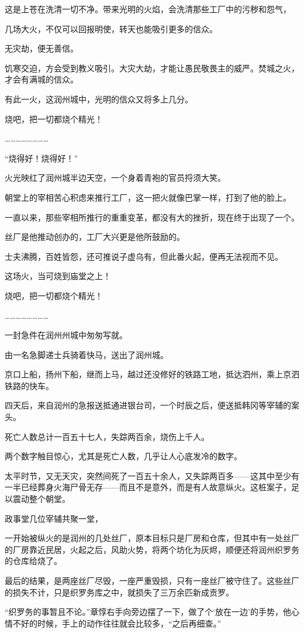 这是上苍在洗清一切不净。带来光明的火焰，会洗清那些工厂中的污秽和怨气，

几场大火，不仅可以回报明使，转天也能吸引更多的信众。

无灾劫，便无善信。

饥寒交迫，方会受到教义吸引。大灾大劫，才能让愚民敬畏主的威严。焚城之火，才会有满城的信众。

有此一火，这润州城中，光明的信众又将多上几分。

烧吧，把一切都烧个精光！

……………………

“烧得好！烧得好！”

火光映红了润州城半边天空，一个身着青袍的官员捋须大笑。

朝堂上的宰相苦心积虑来推行工厂，这一把火就像巴掌一样，打到了他的脸上。

一直以来，那些宰相所推行的重重变革，都没有大的挫折，现在终于出现了一个。

丝厂是他推动创办的，工厂大兴更是他所鼓励的。

士夫沸腾，百姓皆怨，还可推说子虚乌有，但此番火起，便再无法视而不见。

这场火，当可烧到庙堂之上！

烧吧，把一切都烧个精光！

……………………

一封急件在润州州城中匆匆写就。

由一名急脚递士兵骑着快马，送出了润州城。

京口上船，扬州下船，继而上马，越过还没修好的铁路工地，抵达泗州，乘上京泗铁路的快车。

四天后，来自润州的急报送抵通进银台司，一个时辰之后，便送抵韩冈等宰辅的案头。

死亡人数总计一百五十七人，失踪两百余，烧伤上千人。

两个数字触目惊心，尤其是死亡人数，几乎让人心底发冷的数字。

太平时节，又无天灾，突然间死了一百五十余人，又失踪两百多——这其中至少有一半已经葬身火海尸骨无存——而且不是意外，而是有人故意纵火。这桩案子，足以震动整个朝堂。

政事堂几位宰辅共聚一堂，

一开始被纵火的是润州的几处丝厂，原本目标只是厂房和仓库，但其中有一处丝厂的厂房靠近民居，火起之后，风助火势，将两个坊化为灰烬，顺便还将润州织罗务的仓库给烧了。

最后的结果，是两座丝厂尽毁，一座严重毁损，只有一座丝厂被守住了。这些丝厂的损失不计，只是织罗务库之中，就损失了三万余匹新成贡罗。

“织罗务的事暂且不论。”章惇右手向旁边摆了一下，做了个‘放在一边’的手势，他心情不好的时候，手上的动作往往就会比较多，“之后再细查。”

